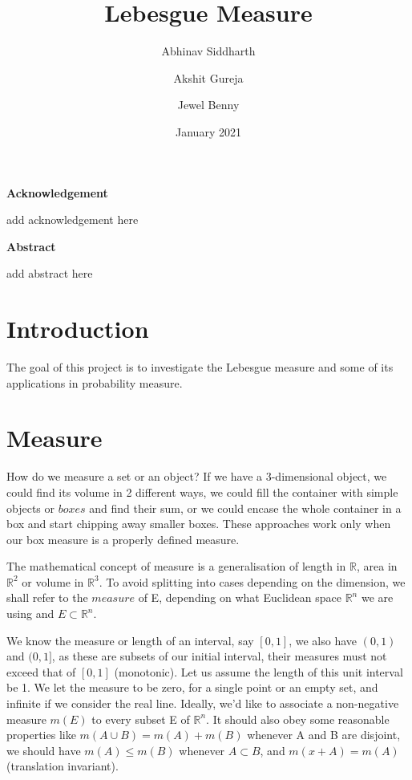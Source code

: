 \documentclass{article}
\title{\textbf{Lebesgue Measure}}
\author{Abhinav Siddharth \and Akshit Gureja \and Jewel Benny}
\date{January 2021}
\begin{document}
\maketitle

\newpage
\begin{center}
    {\Large\bfseries\noindent Acknowledgement}
\end{center}


add acknowledgement here

\newpage

\begin{center}
    {\Large\bfseries\noindent Abstract}
\end{center}

add abstract here
\newpage

\begin{center}
    \tableofcontents
\end{center}

\newpage

\section{Introduction}
The goal of this project is to investigate the Lebesgue measure and some of its applications in probability measure. 

\section{Measure}

How do we measure a set or an object? If we have a 3-dimensional object, we could find its volume in 2 different ways, we could fill the container with simple objects or $boxes$ and find their sum, or we could encase the whole container in a box and start chipping away smaller boxes. These approaches work only when our box measure is a properly defined measure. 

The mathematical concept of measure is a generalisation of length in $\mathbb{R}$, area in $\mathbb{R}^2$ or volume in $\mathbb{R}^3$. To avoid splitting into cases depending on the dimension, we shall refer to the $measure$ of E, depending on what Euclidean space $\mathbb{R}^n$ we are using and $E \subset \mathbb{R}^n$.

We know the measure or length of an interval, say $[0,1]$, we also have $(0,1)$ and $(0,1]$, as these are subsets of our initial interval, their measures must not exceed that of $[0,1]$ (monotonic). Let us assume the length of this unit interval be 1. We let the measure to be zero, for a single point or an empty set, and infinite if we consider the real line. Ideally, we'd like to associate a non-negative measure $m(E)$ to every subset E of $\mathbb{R}^n$. It should also obey some reasonable properties like $m(A \cup B) = m(A) + m(B)$ whenever A and B are disjoint, we should have $m(A) \leq m(B)$ whenever $A \subset B$, and $m(x+A)=m(A)$ (translation invariant).
\end{document}
